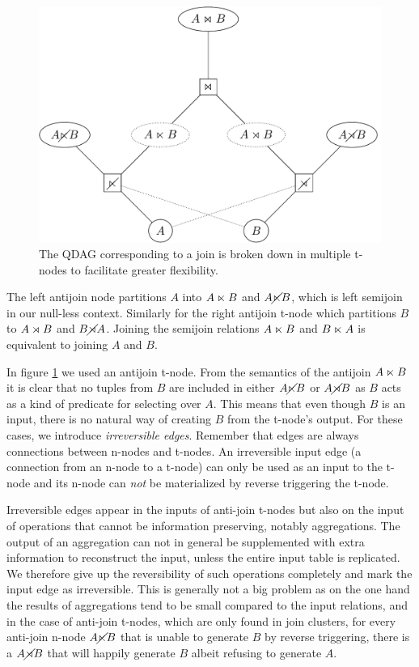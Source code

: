 \begin{figure}[H]
  \centering \includegraphics[width=.9\linewidth]{./imgs/joinnet.pdf}
  \caption{\label{fig:joinnet}The QDAG corresponding to a join is
    broken down in multiple t-nodes to facilitate greater
    flexibility.}
\end{figure}

The left antijoin node partitions \(A\) into \(A \ltimes B\) and
\(A \cancel\ltimes B\), which is left semijoin in our null-less
context. Similarly for the right antijoin t-node which partitions \(B\)
to \(A \rtimes B\) and \(B \cancel\rtimes A\). Joining the semijoin relations
\(A \ltimes B\) and \(B \ltimes A\) is equivalent to joining \(A\) and
\(B\).

In figure \ref{fig:joinnet} we used an antijoin t-node. From the
semantics of the antijoin \(A \ltimes B\) it is clear that no tuples
from \(B\) are included in either \(A \cancel\ltimes B\) or \(A \cancel\rtimes B\)
as \(B\) acts as a kind of predicate for selecting over \(A\). This
means that even though \(B\) is an input, there is no natural way of
creating \(B\) from the t-node's output. For these cases, we introduce
\emph{irreversible edges}. Remember that edges are always connections
between n-nodes and t-nodes. An irreversible input edge (a connection
from an n-node to a t-node) can only be used as an input to the t-node
and its n-node can \emph{not} be materialized by reverse triggering the
t-node.

Irreversible edges appear in the inputs of anti-join t-nodes but also
on the input of operations that cannot be information preserving,
notably aggregations. The output of an aggregation can not in general
be supplemented with extra information to reconstruct the input,
unless the entire input table is replicated. We therefore give up the
reversibility of such operations completely and mark the input edge as
irreversible. This is generally not a big problem as on the one hand
the results of aggregations tend to be small compared to the input
relations, and in the case of anti-join t-nodes, which are only found
in join clusters, for every anti-join n-node \(A \cancel\ltimes B\) that is
unable to generate \(B\) by reverse triggering, there is a \(A \cancel\rtimes
B\) that will happily generate \(B\) albeit refusing to generate
\(A\).

